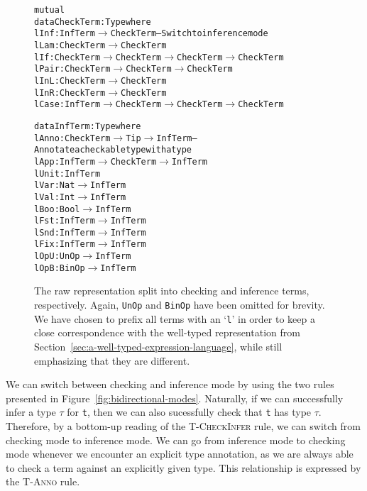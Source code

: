 \begin{figure}
\begin{alltt}
mutual
 data CheckTerm : Type where
   lInf  : InfTerm \(\to\) CheckTerm -- Switch to inference mode
   lLam  : CheckTerm \(\to\) CheckTerm
   lIf   : CheckTerm \(\to\) CheckTerm \(\to\) CheckTerm \(\to\) CheckTerm
   lPair : CheckTerm \(\to\) CheckTerm \(\to\) CheckTerm
   lInL  : CheckTerm \(\to\) CheckTerm
   lInR  : CheckTerm \(\to\) CheckTerm
   lCase : InfTerm \(\to\) CheckTerm \(\to\) CheckTerm \(\to\) CheckTerm
   
 data InfTerm : Type where
   lAnno : CheckTerm \(\to\) Tip \(\to\) InfTerm -- Annotate a checkable type with a type
   lApp  : InfTerm \(\to\) CheckTerm \(\to\) InfTerm
   lUnit : InfTerm
   lVar  : Nat \(\to\) InfTerm
   lVal  : Int \(\to\) InfTerm
   lBoo  : Bool \(\to\) InfTerm
   lFst  : InfTerm \(\to\) InfTerm
   lSnd  : InfTerm \(\to\) InfTerm
   lFix  : InfTerm \(\to\) InfTerm
   lOpU  : UnOp \(\to\) InfTerm
   lOpB  : BinOp \(\to\) InfTerm
\end{alltt}
\caption{The raw representation split into checking and inference terms, respectively. Again, \texttt{UnOp} and \texttt{BinOp} have been omitted for brevity. We have chosen to prefix all terms with an `\texttt{l}' in order to keep a close correspondence with the well-typed representation from Section~\ref{sec:a-well-typed-expression-language}, while still emphasizing that they are different.}
\label{fig:bidirectional-terms}
\end{figure}

We can switch between checking and inference mode by using the two rules presented in Figure~\ref{fig:bidirectional-modes}. Naturally, if we can successfully infer a type $\tau$ for \texttt{t}, then we can also sucessfully check that \texttt{t} has type $\tau$. Therefore, by a bottom-up reading of the \textsc{T-CheckInfer} rule, we can switch from checking mode to inference mode. We can go from inference mode to checking mode whenever we encounter an explicit type annotation, as we are always able to check a term against an explicitly given type. This relationship is expressed by the \textsc{T-Anno} rule.

